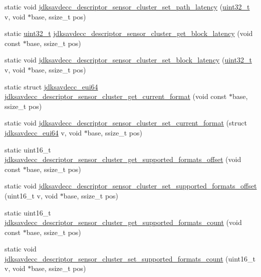\begin{DoxyCompactItemize}
static void \hyperlink{group__descriptor__sensor__cluster_gadaacba2911b9ade158e9cef1b63c50c9}{jdksavdecc\+\_\+descriptor\+\_\+sensor\+\_\+cluster\+\_\+set\+\_\+path\+\_\+latency} (\hyperlink{parse_8c_a6eb1e68cc391dd753bc8ce896dbb8315}{uint32\+\_\+t} v, void $\ast$base, ssize\+\_\+t pos)
\item 
static \hyperlink{parse_8c_a6eb1e68cc391dd753bc8ce896dbb8315}{uint32\+\_\+t} \hyperlink{group__descriptor__sensor__cluster_gabeb6af76d38a76b0fb16eb57b0a1f290}{jdksavdecc\+\_\+descriptor\+\_\+sensor\+\_\+cluster\+\_\+get\+\_\+block\+\_\+latency} (void const $\ast$base, ssize\+\_\+t pos)
\item 
static void \hyperlink{group__descriptor__sensor__cluster_ga5cf8328302c731839fbb5de1771e1f35}{jdksavdecc\+\_\+descriptor\+\_\+sensor\+\_\+cluster\+\_\+set\+\_\+block\+\_\+latency} (\hyperlink{parse_8c_a6eb1e68cc391dd753bc8ce896dbb8315}{uint32\+\_\+t} v, void $\ast$base, ssize\+\_\+t pos)
\item 
static struct \hyperlink{structjdksavdecc__eui64}{jdksavdecc\+\_\+eui64} \hyperlink{group__descriptor__sensor__cluster_ga82e4d4b1ded3ffaa080decf283ed975d}{jdksavdecc\+\_\+descriptor\+\_\+sensor\+\_\+cluster\+\_\+get\+\_\+current\+\_\+format} (void const $\ast$base, ssize\+\_\+t pos)
\item 
static void \hyperlink{group__descriptor__sensor__cluster_ga47c88d90beae0c8a4ccd09d30c9d1b14}{jdksavdecc\+\_\+descriptor\+\_\+sensor\+\_\+cluster\+\_\+set\+\_\+current\+\_\+format} (struct \hyperlink{structjdksavdecc__eui64}{jdksavdecc\+\_\+eui64} v, void $\ast$base, ssize\+\_\+t pos)
\item 
static uint16\+\_\+t \hyperlink{group__descriptor__sensor__cluster_ga11c7e7b4ceed7086f16db4c177e2fd0c}{jdksavdecc\+\_\+descriptor\+\_\+sensor\+\_\+cluster\+\_\+get\+\_\+supported\+\_\+formats\+\_\+offset} (void const $\ast$base, ssize\+\_\+t pos)
\item 
static void \hyperlink{group__descriptor__sensor__cluster_ga3767e700262b6b0534286d30c64bce22}{jdksavdecc\+\_\+descriptor\+\_\+sensor\+\_\+cluster\+\_\+set\+\_\+supported\+\_\+formats\+\_\+offset} (uint16\+\_\+t v, void $\ast$base, ssize\+\_\+t pos)
\item 
static uint16\+\_\+t \hyperlink{group__descriptor__sensor__cluster_ga5bf191e5f84714619a468b9c9c8e7f17}{jdksavdecc\+\_\+descriptor\+\_\+sensor\+\_\+cluster\+\_\+get\+\_\+supported\+\_\+formats\+\_\+count} (void const $\ast$base, ssize\+\_\+t pos)
\item 
static void \hyperlink{group__descriptor__sensor__cluster_gaa153fdcb8403aedc943dad51be0dda11}{jdksavdecc\+\_\+descriptor\+\_\+sensor\+\_\+cluster\+\_\+set\+\_\+supported\+\_\+formats\+\_\+count} (uint16\+\_\+t v, void $\ast$base, ssize\+\_\+t pos)

\end{DoxyCompactItemize}
